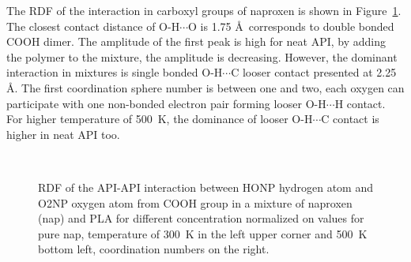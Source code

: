 The RDF of the interaction in carboxyl groups of naproxen is shown in Figure~\ref{fig:nap_RDF_}. The closest contact distance of O-H$\cdots$O is 1.75 \AA~corresponds to double bonded COOH dimer. The amplitude of the first peak is high for neat API, by adding the polymer to the mixture, the amplitude is decreasing. However, the dominant interaction in mixtures is single bonded O-H$\cdots$C looser contact presented at 2.25 \AA. The first coordination sphere number is between one and two, each oxygen can participate with one non-bonded electron pair forming looser O-H$\cdots$H contact. For higher temperature of 500~K, the dominance of looser O-H$\cdots$C contact is higher in neat API too.


\newpage
\begin{figure}[H]
	\centering
	\\
	\vspace{-0.3cm}
	\caption{RDF of the API-API interaction between HONP hydrogen atom and O2NP oxygen atom from COOH group in a mixture of naproxen (nap) and PLA for different concentration normalized on values for pure nap, temperature of 300~K in the left upper corner and 500~K bottom left, coordination numbers on the right.}
	\label{fig:nap_RDF_}
\end{figure}

